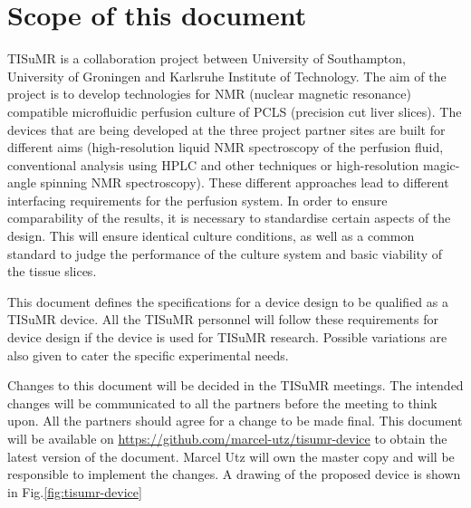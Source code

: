 \documentclass{EU-report}
\begin{document}
\section{Scope of this document}
TISuMR is a collaboration project between University of Southampton, University
of Groningen and Karlsruhe Institute of Technology. The aim of the project is to
develop technologies for NMR (nuclear magnetic resonance) compatible
microfluidic perfusion culture of PCLS (precision cut liver slices).
The devices that are being developed at the three project partner sites
are built for different aims (high-resolution liquid NMR spectroscopy of the
perfusion fluid, conventional analysis using HPLC and other techniques or high-resolution magic-angle spinning NMR spectroscopy). These different
approaches lead to different interfacing requirements for the perfusion system.
In order to ensure comparability of the results, it is necessary to standardise
certain aspects of the design. This will ensure identical culture conditions,
as well as a common standard to judge the performance of the culture
system and basic viability of the tissue slices.

This document defines the specifications for a device design to be qualified as
a TISuMR device. All the TISuMR personnel will follow these requirements for
device design if the device is used for TISuMR research. Possible variations are
also given to cater the specific experimental needs.

Changes to this document will be decided in the TISuMR meetings. The intended
changes will be communicated to all the partners before the meeting to think
upon. All the partners should agree for a change to be made final. This document
will be available on
\url{https://github.com/marcel-utz/tisumr-device} to obtain the latest version
of the document. Marcel Utz will own the master copy and will be responsible to
implement the changes. A drawing of the proposed device is shown in
Fig.\ref{fig:tisumr-device}
\end{document}
